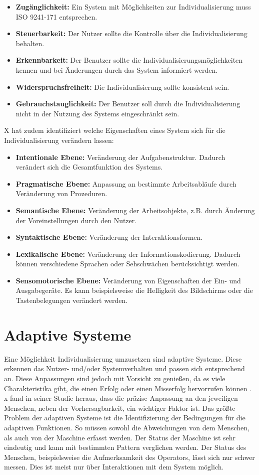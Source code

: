 \begin{itemize}
\item \textbf{Zugänglichkeit:} Ein System mit Möglichkeiten zur Individualisierung muss ISO 9241-171 entsprechen.
\item \textbf{Steuerbarkeit:} Der Nutzer sollte die Kontrolle über die Individualisierung behalten.
\item \textbf{Erkennbarkeit:} Der Benutzer sollte die Individualisierungsmöglichkeiten kennen und bei Änderungen durch das System informiert werden.
\item \textbf{Widerspruchsfreiheit:} Die Individualisierung sollte konsistent sein.
\item \textbf{Gebrauchstauglichkeit:} Der Benutzer soll durch die Individualisierung nicht in der Nutzung des Systems eingeschränkt sein.
\end{itemize}

X hat zudem identifiziert welche Eigenschaften eines System sich für die Individualisierung verändern lassen:
\begin{itemize}
\item \textbf{Intentionale Ebene:} Veränderung der Aufgabenstruktur. Dadurch verändert sich die Gesamtfunktion des Systems.
\item \textbf{Pragmatische Ebene:} Anpassung an bestimmte Arbeitsabläufe durch Veränderung von Prozeduren.
\item \textbf{Semantische Ebene:} Veränderung der Arbeitsobjekte, z.B. durch Änderung der Voreinstellungen durch den Nutzer.
\item \textbf{Syntaktische Ebene:} Veränderung der Interaktionsformen.
\item \textbf{Lexikalische Ebene:} Veränderung der Informationskodierung. Dadurch können verschiedene Sprachen oder Sehschwächen berücksichtigt werden.
\item \textbf{Sensomotorische Ebene:} Veränderung von Eigenschaften der Ein- und Ausgabegeräte. Es kann beispielsweise die Helligkeit des Bildschirms oder die Tastenbelegungen verändert werden.
\end{itemize}

\section{Adaptive Systeme}
Eine Möglichkeit Individualisierung umzusetzen sind adaptive Systeme. Diese erkennen das Nutzer- und/oder Systemverhalten und passen sich entsprechend an. Diese Anpassungen sind jedoch mit Vorsicht zu genießen, da es viele Charakteristika gibt, die einen Erfolg oder einen Misserfolg hervorrufen können \cite{Gajos2008}. x fand in seiner Studie heraus, dass die präzise Anpassung an den jeweiligen Menschen, neben der Vorhersagbarkeit, ein wichtiger Faktor ist. Das größte Problem der adaptiven Systeme ist die Identifizierung der Bedingungen für die adaptiven Funktionen. So müssen sowohl die Abweichungen von dem Menschen, als auch von der Maschine erfasst werden. Der Status der Maschine ist sehr eindeutig und kann mit bestimmten Pattern verglichen werden. Der Status des Menschen, beispielsweise die Aufmerksamkeit des Operators, lässt sich nur schwer messen. Dies ist meist nur über Interaktionen mit dem System möglich. \cite{Viano2000}

